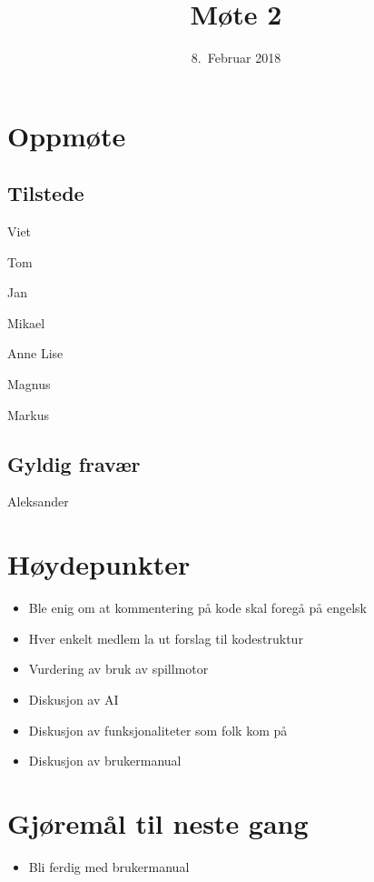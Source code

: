 \documentclass[letterpaper,11pt]{article}
\title{Møte 2}
\date{8.~Februar 2018}
\begin{document}
\maketitle
\section*{Oppmøte}
\subsection*{Tilstede}
\begin{list}{}{}
	\item Viet
	\item Tom
	\item Jan
	\item Mikael
	\item Anne Lise
	\item Magnus
	\item Markus
\end{list}
\subsection*{Gyldig fravær}
\begin{list}{}{}
	\item Aleksander
\end{list}

\newpage
\section*{Høydepunkter}
\begin{itemize}
	\item Ble enig om at kommentering på kode skal foregå på engelsk
	\item Hver enkelt medlem la ut forslag til kodestruktur
	\item Vurdering av bruk av spillmotor
	\item Diskusjon av AI
	\item Diskusjon av funksjonaliteter som folk kom på
	\item Diskusjon av brukermanual
\end{itemize}

\section*{Gjøremål til neste gang}
\begin{itemize}
	\item Bli ferdig med brukermanual
\end{itemize}
\end{document}
